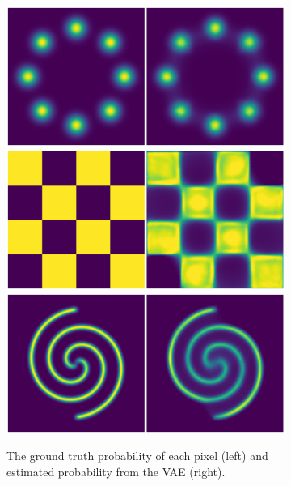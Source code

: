 \documentclass{article}
\begin{document}
\begin{figure}[t]
    \centering
    \begin{subfigure}[b]{0.48\textwidth}
        \centering
                \includegraphics[width=\linewidth]{figures/prob8g.png}
                \includegraphics[width=\linewidth]{figures/probc.png}
                \includegraphics[width=\linewidth]{figures/prob2s.png}
        \caption{The ground truth probability of each pixel (left) and estimated probability from the VAE (right).} \label{fig:density}
    \end{subfigure}
        \begin{subfigure}[b]{0.48\textwidth}

\end{subfigure}
\end{figure}
\end{document}
